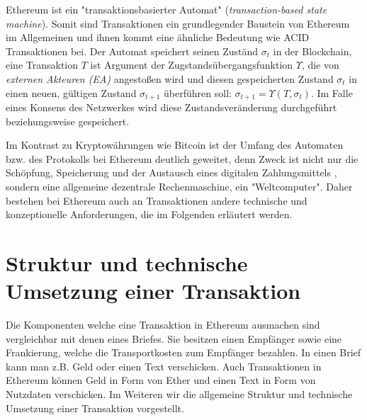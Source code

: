 \documentclass[runningheads]{llncs}
\begin{document}
Ethereum ist ein "transaktionsbasierter Automat" (\textit{transaction-based state machine}). Somit sind Transaktionen ein grundlegender Baustein von Ethereum im Allgemeinen und ihnen kommt eine ähnliche Bedeutung wie ACID Transaktionen bei. Der Automat speichert seinen Zuständ $ \sigma_t $ in der Blockchain, eine Transaktion $ T $ ist Argument der Zugstandsübergangsfunktion $ \Upsilon $, die von \textit{externen Akteuren (EA)} angestoßen wird und diesen gespeicherten Zustand $ \sigma_t $ in einen neuen, gültigen Zustand $ \sigma_{t + 1} $ überführen soll: $\sigma_{t+1} = \Upsilon(T, \sigma_t) $. Im Falle eines Konsens des Netzwerkes wird diese Zustandsveränderung durchgeführt beziehungsweise gespeichert.

Im Kontrast zu Kryptowährungen wie Bitcoin ist der Umfang des Automaten bzw. des Protokolls bei Ethereum deutlich geweitet, denn Zweck ist nicht nur die Schöpfung, Speicherung und der Austausch eines digitalen Zahlungsmittels \cite{nakamoto_bitcoin_nodate}, sondern eine allgemeine dezentrale Rechenmaschine, ein "Weltcomputer". Daher bestehen bei Ethereum auch an Transaktionen andere technische und konzeptionelle Anforderungen, die im Folgenden erläutert werden. \cite[S. 1-4]{wood_ethereum/yellowpaper_2019}

\section{Struktur und technische Umsetzung einer Transaktion}
Die Komponenten welche eine Transaktion in Ethereum ausmachen sind vergleichbar mit denen eines Briefes. Sie besitzen einen Empfänger sowie eine Frankierung, welche die Transportkosten zum Empfänger bezahlen. In einen Brief kann man z.B. Geld oder einen Text verschicken. Auch Transaktionen in Ethereum können Geld in Form von Ether und einen Text in Form von Nutzdaten verschicken. Im Weiteren wir die allgemeine Struktur und technische Umsetzung einer Transaktion vorgestellt.
\end{document}
